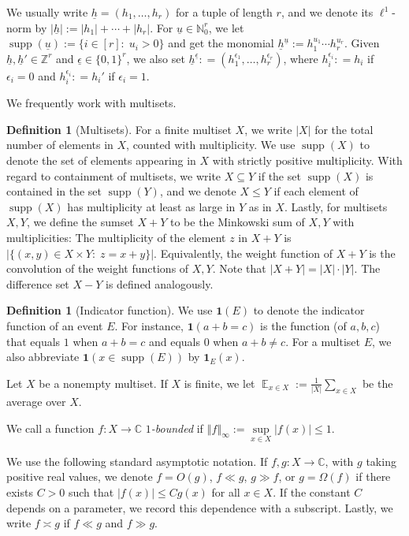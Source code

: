 \documentclass[11pt]{amsart}
\theoremstyle{definition}
\newtheorem{definition}[lemma]{Definition}
\DeclareMathOperator*{\E}{\mathbb{E}}
\newcommand{\C}{{\mathbb C}}
\newcommand{\N}{{\mathbb N}}
\newcommand{\Z}{{\mathbb Z}}
\newcommand{\uh}{{\underline{h}}}
\newcommand{\uu}{{\underline{u}}}
\newcommand{\ueps}{{\underline{\epsilon}}}
\DeclareMathOperator{\supp}{supp}
\newcommand{\norm}[1]{\left\Vert #1\right\Vert}
\begin{document}
We usually write $\uh=(h_1, \ldots, h_r)$ for a tuple of length $r$, and we denote its $\ell^1$-norm by $|\uh|:=|h_1|+\cdots + |h_r|$. For $\uu\in\N_0^r$, we let $\supp(\uu):=\{i\in[r]:\; u_i>0\}$ and get the monomial $\uh^\uu:= h_1^{u_1}\cdots h_r^{u_r}$. Given $\uh,\uh'\in\Z^r$ and $\ueps\in\{0,1\}^r$, we also set $\uh^\ueps: =(h_1^{\epsilon_1}, \ldots, h_r^{\epsilon_r})$, where $h_i^{\epsilon_i}: = h_i$ if $\epsilon_i = 0$ and $h_i^{\epsilon_i}: = h_i'$ if $\epsilon_i = 1$.



We frequently work with multisets. 
\begin{definition}[Multisets]
For a finite multiset $X$, we write $|X|$ for the total number of elements in $X$, counted with multiplicity.  We use $\supp(X)$ to denote the set of elements appearing in $X$ with strictly positive multiplicity.  With regard to containment of multisets, we write $X \subseteq Y$ if the set $\supp(X)$ is contained in the set $\supp(Y)$, and we denote $X \leq Y$ if each element of $ \supp(X)$ has multiplicity at least as large in $Y$ as in $X$. Lastly, for multisets $X,Y$, we define the sumset $X+Y$ to be the Minkowski sum of $X,Y$ with multiplicities: The multiplicity of the element $z$ in $X+Y$ is $|\{(x,y)\in X\times Y:\; z = x+y\}|$.  Equivalently, the weight function of $X+Y$ is the convolution of the weight functions of $X,Y$.  Note that $|X+Y|=|X| \cdot |Y|$.  The difference set $X-Y$ is defined analogously.     
\end{definition}

\begin{definition}[Indicator function]
    We use $\mathbf{1}(E)$ to denote the indicator function of an event $E$.  For instance, $\mathbf{1}(a + b = c)$ is the function (of $a,b,c$) that equals $1$ when $a+b=c$ and equals $0$ when $a+b\neq c$. For a multiset $E$, we also abbreviate $\mathbf{1}(x\in \supp(E))$ by $\mathbf{1}_E(x)$.    
\end{definition}


Let $X$ be a nonempty multiset. If $X$ is finite, we let $\E_{x\in X} := \frac{1}{|X|}\sum_{x\in X}$ be the average over $X$.  




We call a function $f:X\to \C$ \textit{$1$-bounded} if $\norm{f}_\infty:=\sup\limits_{x\in X}|f(x)|\leq 1$. 

We use the following standard asymptotic notation. If $f,g: X\to\C$, with $g$ taking positive real values, we denote $f=O(g)$, $f\ll g$, $g\gg f$, or $g = \Omega(f)$ if there exists $C>0$ such that $|f(x)|\leq C g(x)$ for all $x\in X$.  If the constant $C$ depends on a parameter, we record this dependence with a subscript. Lastly, we write $f\asymp g$ if $f\ll g$ and $f\gg g$.
\end{document}
